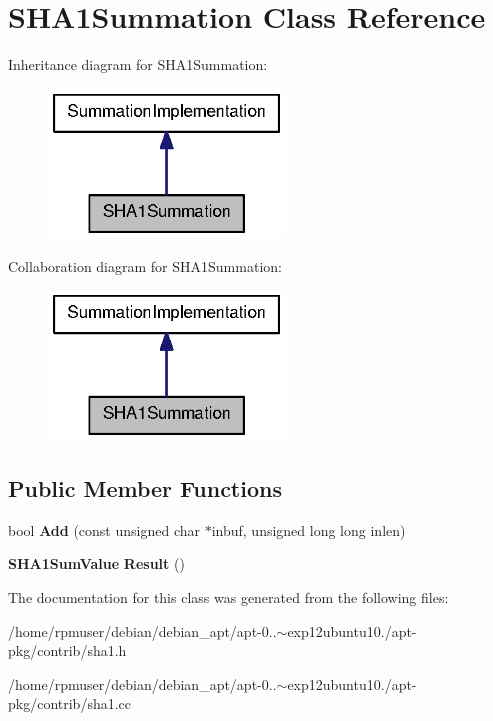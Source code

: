 \section{\-S\-H\-A1\-Summation \-Class \-Reference}
\label{classSHA1Summation}


\-Inheritance diagram for \-S\-H\-A1\-Summation\-:
\nopagebreak
\begin{figure}[H]
\begin{center}
\leavevmode
\includegraphics[width=178pt]{classSHA1Summation__inherit__graph}
\end{center}
\end{figure}


\-Collaboration diagram for \-S\-H\-A1\-Summation\-:
\nopagebreak
\begin{figure}[H]
\begin{center}
\leavevmode
\includegraphics[width=178pt]{classSHA1Summation__coll__graph}
\end{center}
\end{figure}
\subsection*{\-Public \-Member \-Functions}
\begin{DoxyCompactItemize}
\item 
bool {\bfseries \-Add} (const unsigned char $\ast$inbuf, unsigned long long inlen)\label{classSHA1Summation_a40d3316c4ec4117ba34228572ea32a65}

\item 
{\bf \-S\-H\-A1\-Sum\-Value} {\bfseries \-Result} ()\label{classSHA1Summation_a730784552136c37fd6abd99657120567}

\end{DoxyCompactItemize}


\-The documentation for this class was generated from the following files\-:\begin{DoxyCompactItemize}
\item 
/home/rpmuser/debian/debian\-\_\-apt/apt-\/0..$\sim$exp12ubuntu10./apt-\/pkg/contrib/sha1.\-h\item 
/home/rpmuser/debian/debian\-\_\-apt/apt-\/0..$\sim$exp12ubuntu10./apt-\/pkg/contrib/sha1.\-cc\end{DoxyCompactItemize}
